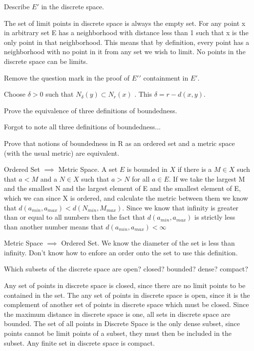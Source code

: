 \documentclass[12pt]{article}
\newenvironment{exercise}[2][Exercise]{\begin{trivlist}
\item[\hskip \labelsep {\bfseries #1}\hskip \labelsep {\bfseries #2.}]}{\end{trivlist}}
\begin{document}
\begin{exercise}{1.4}
Describe $E\prime$ in  the discrete space.
\end{exercise}
The set of limit points in discrete space is always the empty set. For any point x in arbitrary set E has a neighborhood with distance less than 1 such that x is the only point in that neighborhood. This means that by definition, every point has a neighborhood with no point in it from any set we wish to limit. No points in the discrete space can be limits.

\begin{exercise}{1.5}
Remove the question mark in the proof of $E\prime\prime$ containment in $E\prime$. 
\end{exercise}
Choose $\delta > 0$ such that $N_{\delta}(y)\subset N_{r}(x)$ . This $\delta = r - d(x,y)$.

\begin{exercise}{2.1}
Prove the equivalence of three definitions of boundedness.
\end{exercise}
Forgot to note all three definitions of boundedness...

\begin{exercise}{2.2}
Prove that notions of boundedness in R as an ordered set and a  metric space (with the usual metric) are equivalent. 
\end{exercise}

Ordered Set $\implies$ Metric Space. A set $E$ is bounded in $X$ if there is a $M \in X$ such that $a < M $ and a $N \in X$ such that $a > N$ for all $a \in E$. If we take the largest M and the smallest N and the largest element of E and the smallest element of E, which we can since X is ordered, and calculate the metric between them we know that $d(a_{min}, a_{max}) < d(N_{min}, M_{max})$. Since we know that infinity is greater than or equal to all numbers then the fact that $d(a_{min}, a_{max})$ is strictly less than another number means that $d(a_{min}, a_{max}) < \infty$

Metric Space $\implies$ Ordered Set. We know the diameter of the set is less than infinity. Don't know how to enfore an order onto the set to use this definition.


\begin{exercise}{2.3}
Which subsets of the discrete space are open? closed? bounded? dense? compact?  
\end{exercise}
Any set of points in discrete space is closed, since there are no limit points to be contained in the set. The any set of points in discrete space is open, since it is the complement of another set of points in discrete space which must be closed. Since the maximum distance in discrete space is one, all sets in discrete space are bounded. The set of all points in Discrete Space is the only dense subset, since points cannot be limit points of a subset, they must then be included in the subset. Any finite set in discrete space is compact.
\end{document}
